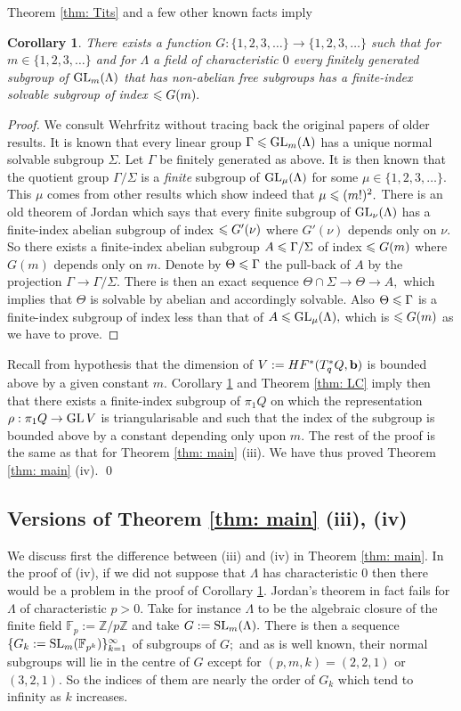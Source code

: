 \documentclass{article}
\theoremstyle{plain}%
\newtheorem{cor}[thm]{Corollary}
\theoremstyle{definition}
\numberwithin{equation}{section}
\numberwithin{figure}{section}
\def\l{\label}
\def\F{{\mathbb F}}
\def\SL{\mathop{\rm SL}}
\def\GL{\mathop{\rm GL}}
\def\le{\leqslant\nobreak}
\def\Z{{\mathbin{\mathbb Z}}}
\def\r{\rho}
\def\La{\Lambda}
\def\Si{\Sigma}
\def\Th{\Theta}
\def\Ga{\Gamma}
\def\iy{\infty}
\begin{document}
Theorem \ref{thm: Tits} and a few other known facts imply
\begin{cor}\l{cor: Tits}
There exists a function $G:\{1,2,3,\dots\}\to \{1,2,3,\dots\}$ such that for $m\in\{1,2,3,\dots\}$ and for $\La$ a field of characteristic $0$ every finitely generated subgroup of $\GL_m(\La)$ that has non-abelian free subgroups has a finite-index solvable subgroup of index $\le G(m).$
\end{cor}
\begin{proof}
We consult Wehrfritz \cite{Wehr0,Wehr} without tracing back the original papers of older results.
It is known \cite[Corollary 3.8]{Wehr} that every linear group $\Ga\le \GL_m(\La)$ has a unique normal solvable subgroup $\Si.$ Let $\Ga$ be finitely generated as above. It is then known \cite[Lemma 2]{Wehr0} that the quotient group $\Ga/\Si$ is a {\it finite} subgroup of $\GL_\mu(\La)$ for some $\mu\in\{1,2,3,\dots\}.$ This $\mu$ comes from other results \cite[Theorems 6.3 and 6.4]{Wehr} which show indeed that $\mu\le (m!)^2.$ There is an old theorem of Jordan \cite[Theorem 9.2]{Wehr} which says that every finite subgroup of $\GL_\nu(\La)$ has a finite-index abelian subgroup of index $\le G'(\nu)$ where $G'(\nu)$ depends only on $\nu.$ So there exists a finite-index abelian subgroup $A\le\Ga/\Si$ of index $\le G(m)$ where $G(m)$ depends only on $m.$ Denote by $\Th\le\Ga$ the pull-back of $A$ by the projection $\Ga\to\Ga/\Si.$ There is then an exact sequence $\Th\cap \Si\to \Th\to A,$ which implies that $\Th$ is solvable by abelian and accordingly solvable. Also $\Th\le\Ga$ is a finite-index subgroup of index less than that of $A\le \GL_\mu(\La),$ which is $\le G(m)$ as we have to prove.
\end{proof}


Recall from hypothesis that the dimension of $V:=HF^*(T_q^*Q,{\mathbf{b}})$ is bounded above by a given constant $m.$ Corollary \ref{cor: Tits} and Theorem \ref{thm: LC} imply then that there exists a finite-index subgroup of $\pi_1Q$ on which the representation $\r:\pi_1Q\to \GL V$ is triangularisable and such that the index of the subgroup is bounded above by a constant depending only upon $m.$ The rest of the proof is the same as that for Theorem \ref{thm: main} (iii). We have thus proved Theorem \ref{thm: main} (iv).
\qed

\subsection{Versions of Theorem \ref{thm: main} (iii), (iv)}\l{sec: discuss}
We discuss first the difference between (iii) and (iv) in Theorem \ref{thm: main}. In the proof of (iv), if we did not suppose that $\La$ has characteristic $0$ then there would be a problem in the proof of Corollary \ref{cor: Tits}. Jordan's theorem in fact fails for $\La$ of characteristic $p>0.$ Take for instance $\La$ to be the algebraic closure of the finite field $\F_p:=\Z/p\Z$ and take $G:=\SL_m(\La).$ There is then a sequence $\{G_k:=\SL_m(\F_{p^k})\}_{k=1}^\iy$ of subgroups of $G;$ and as is well known, their normal subgroups will lie in the centre of $G$ except for $(p,m,k)=(2,2,1)$ or $(3,2,1).$ So the indices of them are nearly the order of $G_k$ which tend to infinity as $k$ increases. 
\end{document}
